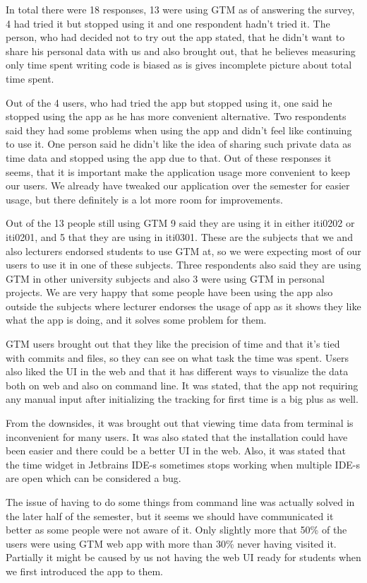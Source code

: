 In total there were 18 responses, 13 were using GTM as of answering the survey, 4 had tried it but stopped using it and one respondent hadn't tried it.
The person, who had decided not to try out the app stated, that he didn't want to share his personal data with us and also brought out,
that he believes measuring only time spent writing code is biased as is gives incomplete picture about total time spent.

Out of the 4 users, who had tried the app but stopped using it, one said he stopped using the app as he has more convenient alternative.
Two respondents said they had some problems when using the app and didn't feel like continuing to use it.
One person said he didn't like the idea of sharing such private data as time data and stopped using the app due to that.
Out of these responses it seems, that it is important make the application usage more convenient to keep our users.
We already have tweaked our application over the semester for easier usage, but there definitely is a lot more room for improvements.

Out of the 13 people still using GTM 9 said they are using it in either iti0202 or iti0201, and 5 that they are using in iti0301.
These are the subjects that we and also lecturers endorsed students to use GTM at, so we were expecting most of our
users to use it in one of these subjects.
Three respondents also said they are using GTM in other university subjects and also 3 were using GTM in personal projects.
We are very happy that some people have been using the app also outside the subjects where lecturer endorses the usage of app
as it shows they like what the app is doing, and it solves some problem for them.

GTM users brought out that they like the precision of time and that it's tied with commits and files, so they can see
on what task the time was spent.
Users also liked the UI in the web and that it has different ways to visualize the data both on web and also on command line.
It was stated, that the app not requiring any manual input after initializing the tracking for first time is a big plus as well.

From the downsides, it was brought out that viewing time data from terminal is inconvenient for many users.
It was also stated that the installation could have been easier and there could be a better UI in the web.
Also, it was stated that the time widget in Jetbrains IDE-s sometimes stops working when multiple IDE-s are open
which can be considered a bug.

The issue of having to do some things from command line was actually solved in the later half of the semester, but it seems
we should have communicated it better as some people were not aware of it.
Only slightly more that 50\% of the users were using GTM web app with more than 30\% never having visited it.
Partially it might be caused by us not having the web UI ready for students when we first introduced the app to them.

